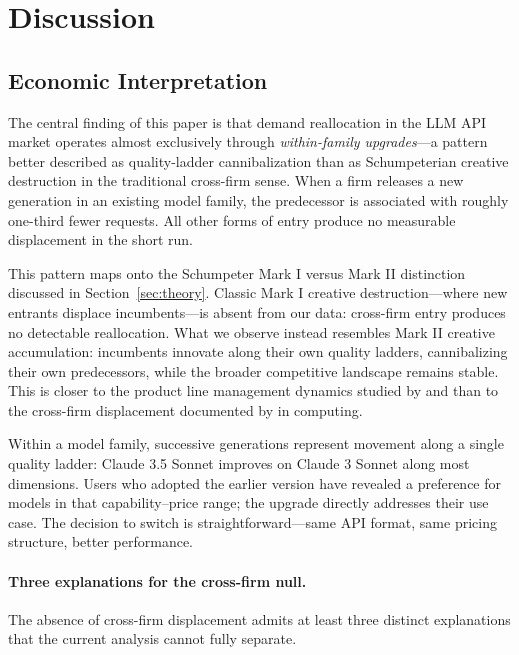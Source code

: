\documentclass[11pt, a4paper]{article}
\begin{document}
\section{Discussion}
\label{sec:discussion}

\subsection{Economic Interpretation}

The central finding of this paper is that demand reallocation in the LLM API market operates almost exclusively through \emph{within-family upgrades}---a pattern better described as quality-ladder cannibalization than as Schumpeterian creative destruction in the traditional cross-firm sense. When a firm releases a new generation in an existing model family, the predecessor is associated with roughly one-third fewer requests. All other forms of entry produce no measurable displacement in the short run.

This pattern maps onto the Schumpeter Mark I versus Mark II distinction discussed in Section~\ref{sec:theory}. Classic Mark I creative destruction---where new entrants displace incumbents---is absent from our data: cross-firm entry produces no detectable reallocation. What we observe instead resembles Mark II creative accumulation: incumbents innovate along their own quality ladders, cannibalizing their own predecessors, while the broader competitive landscape remains stable. This is closer to the product line management dynamics studied by \citet{desai2001product} and \citet{draganska2005product} than to the cross-firm displacement documented by \citet{bresnahan1999technological} in computing.

Within a model family, successive generations represent movement along a single quality ladder: Claude 3.5 Sonnet improves on Claude 3 Sonnet along most dimensions. Users who adopted the earlier version have revealed a preference for models in that capability--price range; the upgrade directly addresses their use case. The decision to switch is straightforward---same API format, same pricing structure, better performance.

\paragraph{Three explanations for the cross-firm null.} The absence of cross-firm displacement admits at least three distinct explanations that the current analysis cannot fully separate.
\end{document}
